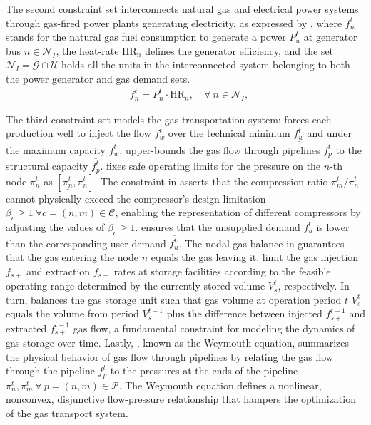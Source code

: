The second constraint set interconnects natural gas and electrical power systems through gas-fired power plants generating electricity, as expressed by  , where $f_{n}^t$ stands for the natural gas fuel consumption to generate a power $P_{n}^t$ at generator bus $n\in\mathcal{N}_I$, the heat-rate $\text{HR}_n$ defines the generator efficiency, and the set $\mathcal{N}_I=\mathcal{G}\cap\mathcal{U}$ holds all the units in the interconnected system belonging to both the power generator and gas demand sets.
\begin{align}
    &f_{n}^t = P_{n}^t \cdot \text{HR}_n, \quad \forall \ n \in \mathcal{N}_I, \label{eq:gas_power_relation} 
\end{align}

The third constraint set models the gas transportation system:  forces each production well to inject the flow $f_{w}^t$ over the technical minimum $\underline{f_{w}^t}$ and under the maximum capacity $\overline{f_{w}^t}$.  upper-bounds the gas flow through pipelines $f_{p}^t$ to the structural capacity $\overline{f_{p}^t}$.  fixes safe operating limits for the pressure on the $n$-th node $\pi_{n}^t$ as $[\underline{\pi_{n}^t},\overline{\pi_{n}^t}]$. The constraint in  asserts that the compression ratio $\pi_{m}^t / \pi_{n}^t$ cannot physically exceed the compressor's design limitation  $\beta_{c}\geq1 \ \forall c=(n,m) \in \mathcal{C}$, enabling the representation of different compressors by adjusting the values of $\beta_{c}\geq1$.  ensures that the unsupplied demand $f_{u}^{t}$ is lower than the corresponding user demand $\overline{f_{u}^{t}}$. The nodal gas balance in  guarantees that the gas entering the node $n$ equals the gas leaving it.  limit the gas injection $f_{s+}$  and extraction $f_{s-}$ rates at storage facilities according to the feasible operating range determined by the currently stored volume $V_{s}^t$, respectively. In turn,  balances the gas storage unit such that gas volume at operation period $t$ $V_{s}^t$ equals the volume from period $V_{s}^{t-1}$ plus the difference between injected $f_{s+}^{t-1}$ and extracted $f_{s+}^{t-1}$ gas flow, a fundamental constraint for modeling the dynamics of gas storage over time. Lastly, , known as the Weymouth equation, summarizes the physical behavior of gas flow through pipelines by relating the gas flow through the pipeline $f_{p}^t$ to the pressures at the ends of the pipeline $\pi_{n}^t, \pi_{m}^t \ \forall \ p = (n,m) \in\mathcal{P}$. The Weymouth equation defines a nonlinear, nonconvex, disjunctive flow-pressure relationship that hampers the optimization of the gas transport system.
